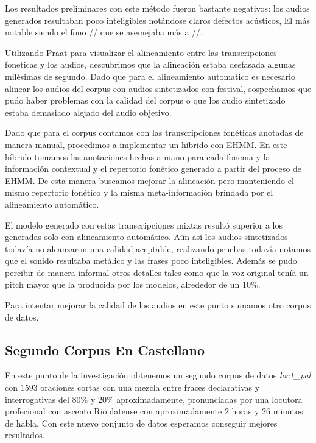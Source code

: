 Los resultados preliminares con este método fueron bastante negativos: los audios generados resultaban poco inteligibles notándose claros defectos acústicos, El más notable siendo el fono // que se asemejaba más a //.

Utilizando Praat para visualizar el alineamiento entre las transcripciones foneticas y los audios, descubrimos que la alineación estaba desfasada algunas milésimas de segundo. Dado que para el alineamiento automatico es necesario alinear los audios del corpus con audios sintetizados con festival, sospechamos que pudo haber problemas con la calidad del corpus o que los audio sintetizado estaba demasiado alejado del audio objetivo.

Dado que para el corpus contamos con las transcripciones fonéticas anotadas de manera manual, procedimos a implementar un híbrido con EHMM. En este híbrido tomamos las anotaciones hechas a mano para cada fonema y la información contextual y el repertorio fonético generado a partir del proceso de EHMM. De esta manera buscamos mejorar la alineación pero manteniendo el mismo repertorio fonético y la misma meta-información brindada por el alineamiento automático.

El modelo generado con estas transcripciones mixtas resultó superior a los generadas solo con alineamiento automático. Aún así los audios sintetizados todavía no alcanzaron una calidad aceptable, realizando pruebas todavía notamos que el sonido resultaba metálico y las frases poco inteligibles. Además se pudo percibir de manera informal otros detalles tales como que la voz original tenía un pitch mayor que la producida por los modelos, alrededor de un $10\%$.

Para intentar mejorar la calidad de los audios en este punto sumamos otro corpus de datos.

\subsection{Segundo Corpus En Castellano}

En este punto de la investigación obtenemos un segundo corpus de datos \textit{loc1\_pal} \cite{loc1pal} con $1593$ oraciones cortas con una mezcla entre fraces declarativas y interrogativas del $80\%$ y $20\%$ aproximadamente, pronunciadas por una locutora profecional con ascento Rioplatense con aproximadamente $2$ horas y $26$ minutos de habla. Con este nuevo conjunto de datos esperamos conseguir mejores resultados.

